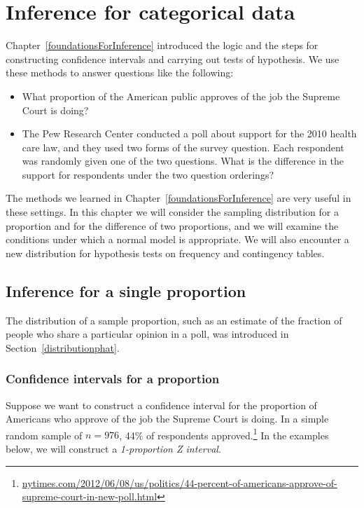 \chapter{Inference for categorical data}
\label{inferenceForCategoricalData}

Chapter~\ref{foundationsForInference} introduced the logic and the steps for constructing confidence intervals and carrying out tests of hypothesis. We use these methods to answer questions like the following:
\begin{itemize}
\setlength{\itemsep}{0mm}
\item What proportion of the American public approves of the job the Supreme Court is doing?
\item The Pew Research Center conducted a poll about support for the 2010 health care law, and they used two forms of the survey question. Each respondent was randomly given one of the two questions. What is the difference in the support for respondents under the two question orderings?
\end{itemize}
The methods we learned in Chapter~\ref{foundationsForInference} are very useful in these settings. In this chapter we will consider the sampling distribution for a proportion and for the difference of two proportions, and we will examine the conditions under which a normal model is appropriate. We will also encounter a new distribution for hypothesis tests on frequency and contingency tables.



\section{Inference for a single proportion}
\label{singleProportion}

The distribution of a sample proportion, such as an estimate of the fraction of people who share a particular opinion in a poll, was introduced in Section~\ref{distributionphat}.

\subsection{Confidence intervals for a proportion}
\label{confIntForPropSection}


Suppose we want to construct a confidence interval for the proportion of Americans who approve of the job the Supreme Court is doing. In a simple random sample of $n = 976$, 44\% of respondents approved.\footnote{\href{http://www.nytimes.com/2012/06/08/us/politics/44-percent-of-americans-approve-of-supreme-court-in-new-poll.html}{\scriptsize nytimes.com/2012/06/08/us/politics/44-percent-of-americans-approve-of-supreme-court-in-new-poll.html}} In the examples below, we will construct a \emph{1-proportion Z interval}.



